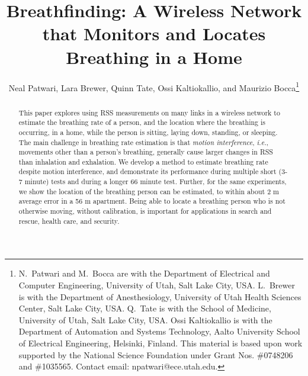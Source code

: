 \documentclass[10pt,journal,letterpaper]{IEEEtran}
\newcommand{\ie}{{\it i.e.}}
\begin{document}
\title{Breathfinding: A Wireless Network that Monitors and Locates Breathing in a Home}


\author{Neal Patwari, Lara Brewer, Quinn Tate, Ossi Kaltiokallio, and Maurizio Bocca\thanks{ N.~Patwari and M.~Bocca are with the Department
of Electrical and Computer Engineering, University of Utah, Salt Lake City, USA.  L.~Brewer is with the Department of Anesthesiology, University of Utah Health Sciences Center, Salt Lake City, USA.  Q.~Tate is with the School of Medicine, University of Utah, Salt Lake City, USA.  Ossi Kaltiokallio is with the Department of Automation and Systems Technology, Aalto University School of Electrical Engineering, 
Helsinki, Finland.  This material is based upon work supported by the National Science Foundation under Grant Nos. \#0748206 and \#1035565.  Contact email: npatwari@ece.utah.edu.}}




\maketitle
\begin{abstract}
This paper explores using RSS measurements on many links in a wireless network to estimate the breathing rate of a person, and the location where the breathing is occurring, in a home, while the person is sitting, laying down, standing, or sleeping.  The main challenge in breathing rate estimation is that \emph{motion interference}, \ie, movements other than a person's breathing, generally cause larger changes in RSS than inhalation and exhalation.  We develop a method to estimate breathing rate despite motion interference, and demonstrate its performance during multiple short (3-7 minute) tests and during a longer 66 minute test.  Further, for the same experiments, we show the location of the breathing person can be estimated, to within about 2 m average error in a 56 m apartment. Being able to locate a breathing person who is not otherwise moving, without calibration, is important for applications in search and rescue, health care, and security.
\end{abstract}
\end{document}
